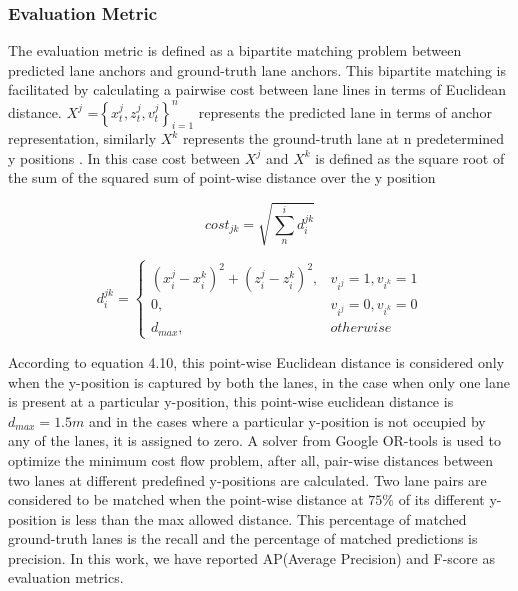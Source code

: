              \subsubsection{Evaluation Metric}
            
            The evaluation metric is defined \cite{guo2020gen} as a bipartite matching problem between predicted lane anchors and ground-truth lane anchors. This bipartite matching is facilitated by calculating a pairwise cost between lane lines in terms of Euclidean distance.  $X^{j}$ =$ \left\{x^{j}_{t},z^{j}_{t},v^{j}_{t}\right\}_{i=1}^{n}     $ represents the predicted lane in terms of anchor representation, similarly $X^{k}$ represents the ground-truth lane at n predetermined y positions \cite{guo2020gen}. In this case cost between $X^{j}$ and $X^{k}$ is defined as the square root of the sum of the squared sum of point-wise distance over the y position \cite{guo2020gen}
            
            \begin{equation}
             cost_{jk} = \sqrt{\sum_n^i d_{i}^{jk}}
            \end{equation}
            
            \begin{equation}
              d_{i}^{jk} = \begin{cases}(x_{i}^{j} - x_{i}^{k} )^{2} + (z_{i}^{j} - z_{i}^{k} )^{2},  & v_{i^{j}} =1, v_{i^{k}} =1 \\0,   & v_{i^{j}} =0, v_{i^{k}} =0\\ d_{max}, & otherwise\end{cases}
            \end{equation}
            
            According to equation 4.10, \cite{guo2020gen} this point-wise Euclidean distance is considered only when the y-position is captured by both the lanes, in the case when only one lane is present at a particular y-position, this point-wise euclidean distance is $d_{max} = 1.5m$ and in the cases where a particular y-position is not occupied by any of the lanes, it is assigned to zero. A solver from Google OR-tools  is used to optimize the minimum cost flow problem, after all, pair-wise distances between two lanes at different predefined y-positions are calculated. Two lane pairs are considered to be matched when the point-wise distance at $75\%$ of its different y-position is less than the max allowed distance. This  \cite{guo2020gen}percentage of matched ground-truth lanes is the recall and the percentage of matched predictions is  precision. In this work, we have reported AP(Average Precision) and F-score as evaluation metrics. 
            
